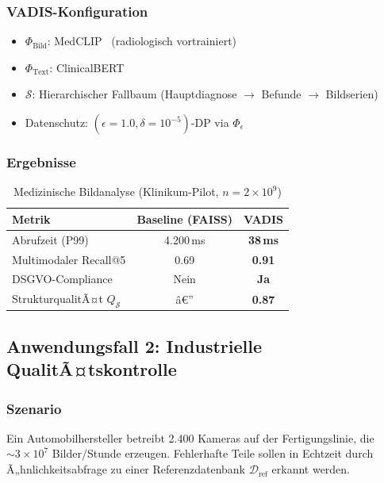 ﻿\documentclass[12pt,a4paper]{article}
\begin{document}
\subsubsection{VADIS-Konfiguration}

\begin{itemize}[leftmargin=1.2em, itemsep=1pt]
  \item $\Phi_{\text{Bild}}$: MedCLIP~\cite{wang2022medclip}
        (radiologisch vortrainiert)
  \item $\Phi_{\text{Text}}$: ClinicalBERT~\cite{alsentzer2019clinicalbert}
  \item $\mathcal{S}$: Hierarchischer Fallbaum (Hauptdiagnose $\to$
        Befunde $\to$ Bildserien)
  \item Datenschutz: $(\epsilon=1.0, \delta=10^{-5})$-DP via
        $\Phi_\epsilon$
\end{itemize}

\subsubsection{Ergebnisse}

\begin{table}[ht]
\centering
\small
\caption{Medizinische Bildanalyse (Klinikum-Pilot, $n=2\times10^9$)}
\label{tab:medical}
\begin{tabular}{@{}lcc@{}}
\toprule
\textbf{Metrik} & \textbf{Baseline (FAISS)} & \textbf{VADIS} \\
\midrule
Abrufzeit (P99) & 4.200\,ms & \textbf{38\,ms} \\
Multimodaler Recall@5 & 0.69 & \textbf{0.91} \\
DSGVO-Compliance & Nein & \textbf{Ja} \\
StrukturqualitÃ¤t $Q_\mathcal{S}$ & â€” & \textbf{0.87} \\
\bottomrule
\end{tabular}
\end{table}

\subsection{Anwendungsfall 2: Industrielle QualitÃ¤tskontrolle}

\subsubsection{Szenario}
Ein Automobilhersteller betreibt 2.400 Kameras auf der Fertigungslinie,
die $\sim 3 \times 10^7$ Bilder/Stunde erzeugen. Fehlerhafte Teile
sollen in Echtzeit durch Ã„hnlichkeitsabfrage zu einer
Referenzdatenbank $\mathcal{D}_{\text{ref}}$ erkannt werden.
\end{document}
